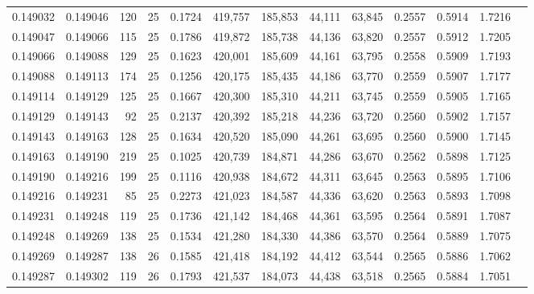 \begin{tabular}{rrrrrrrrrrrrr}
0.149032 & 0.149046 &   120 &  25 &                                     0.1724 & 419,757 & 185,853 &  44,111 &  63,845 & 0.2557 & 0.5914 & 1.7216 \\
0.149047 & 0.149066 &   115 &  25 &                                     0.1786 & 419,872 & 185,738 &  44,136 &  63,820 & 0.2557 & 0.5912 & 1.7205 \\
0.149066 & 0.149088 &   129 &  25 &                                     0.1623 & 420,001 & 185,609 &  44,161 &  63,795 & 0.2558 & 0.5909 & 1.7193 \\
0.149088 & 0.149113 &   174 &  25 &                                     0.1256 & 420,175 & 185,435 &  44,186 &  63,770 & 0.2559 & 0.5907 & 1.7177 \\
0.149114 & 0.149129 &   125 &  25 &                                     0.1667 & 420,300 & 185,310 &  44,211 &  63,745 & 0.2559 & 0.5905 & 1.7165 \\
0.149129 & 0.149143 &    92 &  25 &                                     0.2137 & 420,392 & 185,218 &  44,236 &  63,720 & 0.2560 & 0.5902 & 1.7157 \\
0.149143 & 0.149163 &   128 &  25 &                                     0.1634 & 420,520 & 185,090 &  44,261 &  63,695 & 0.2560 & 0.5900 & 1.7145 \\
0.149163 & 0.149190 &   219 &  25 &                                     0.1025 & 420,739 & 184,871 &  44,286 &  63,670 & 0.2562 & 0.5898 & 1.7125 \\
0.149190 & 0.149216 &   199 &  25 &                                     0.1116 & 420,938 & 184,672 &  44,311 &  63,645 & 0.2563 & 0.5895 & 1.7106 \\
0.149216 & 0.149231 &    85 &  25 &                                     0.2273 & 421,023 & 184,587 &  44,336 &  63,620 & 0.2563 & 0.5893 & 1.7098 \\
0.149231 & 0.149248 &   119 &  25 &                                     0.1736 & 421,142 & 184,468 &  44,361 &  63,595 & 0.2564 & 0.5891 & 1.7087 \\
0.149248 & 0.149269 &   138 &  25 &                                     0.1534 & 421,280 & 184,330 &  44,386 &  63,570 & 0.2564 & 0.5889 & 1.7075 \\
0.149269 & 0.149287 &   138 &  26 &                                     0.1585 & 421,418 & 184,192 &  44,412 &  63,544 & 0.2565 & 0.5886 & 1.7062 \\
0.149287 & 0.149302 &   119 &  26 &                                     0.1793 & 421,537 & 184,073 &  44,438 &  63,518 & 0.2565 & 0.5884 & 1.7051 \\

\end{tabular}
